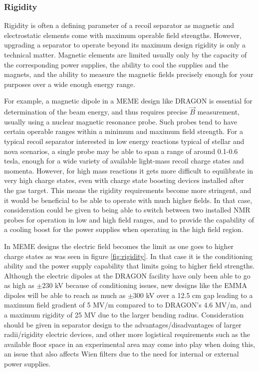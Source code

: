 \subsubsection{Rigidity}

Rigidity is often a defining parameter of a recoil separator as magnetic and electrostatic elements come with maximum operable field strengths. However, upgrading a separator to operate beyond its maximum design rigidity is only a technical matter. Magnetic elements are limited usually only by the capacity of the corresponding power supplies, the ability to cool the supplies and the magnets, and the ability to measure the magnetic fields precisely enough for your purposes over a wide enough energy range. 

For example, a magnetic dipole in a MEME design like DRAGON is essential for determination of the beam energy, and thus requires precise $\vec{B}$ measurement, usually using a nuclear magnetic resonance probe.  Such probes tend to have certain operable ranges within a minimum and maximum field strength. For a typical recoil separator interested in low energy reactions typical of stellar and nova scenarios, a single probe may be able to span a range of around 0.1-0.6 tesla, enough for a wide variety of available light-mass recoil charge states and momenta. However, for high mass reactions it gets more difficult to equilibrate in very high charge states, even with charge state boosting devices installed after the gas target. This means the rigidity requirements become more stringent, and it would be beneficial to be able to operate with much higher fields. In that case, consideration could be given to being able to switch between two installed NMR probes for operation in low and high field ranges, and to provide the capability of a cooling boost for the power supplies when operating in the high field region.   

In MEME designs the electric field becomes the limit as one goes to higher charge states as was seen in figure \ref{fig:rigidity}. In that case it is the conditioning ability and the power supply capability that limits going to higher field strengths. Although the electric dipoles at the DRAGON facility have only been able to go as high as $\pm230$ kV because of conditioning issues, new designs like the EMMA dipoles will be able to reach as much as $\pm300$ kV over a 12.5 cm gap \cite{dav05} leading to a maximum field gradient of 5 MV/m compared to to DRAGON's 4.6 MV/m, and a maximum rigidity of 25 MV due to the larger bending radius. Consideration should be given in separator design to the advantages/disadvantages of larger radii/rigidity electric devices, and other more logistical requirements such as the available floor space in an experimental area may come into play when doing this, an issue that also affects Wien filters due to the need for internal or external power supplies. 
 
